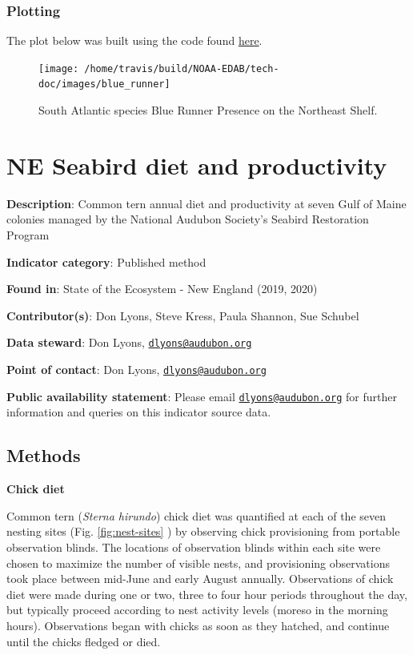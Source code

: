 \documentclass[
]{book}
\begin{document}
\hypertarget{plotting-24}{%
\subsection{Plotting}\label{plotting-24}}

The plot below was built using the code found
\href{https://github.com/NOAA-EDAB/ecodata/blob/master/chunk-scripts/macrofauna.Rmd-blue-runner.R}{here}.

\begin{figure}
\texttt{[image: /home/travis/build/NOAA-EDAB/tech-doc/images/blue\_runner]} \caption{South Atlantic species Blue Runner Presence on the Northeast Shelf.}\label{fig:unnamed-chunk-33}
\end{figure}

\hypertarget{ne-seabird-diet-and-productivity}{%
\chapter{NE Seabird diet and productivity}\label{ne-seabird-diet-and-productivity}}

\textbf{Description}: Common tern annual diet and productivity at seven Gulf of Maine colonies managed by the National Audubon Society's Seabird Restoration Program

\textbf{Indicator category}: Published method

\textbf{Found in}: State of the Ecosystem - New England (2019, 2020)

\textbf{Contributor(s)}: Don Lyons, Steve Kress, Paula Shannon, Sue Schubel

\textbf{Data steward}: Don Lyons, \href{mailto:dlyons@audubon.org}{\nolinkurl{dlyons@audubon.org}}

\textbf{Point of contact}: Don Lyons, \href{mailto:dlyons@audubon.org}{\nolinkurl{dlyons@audubon.org}}

\textbf{Public availability statement}: Please email \href{mailto:dlyons@audubon.org}{\nolinkurl{dlyons@audubon.org}} for further information and queries on this indicator source data.

\hypertarget{methods-32}{%
\section{Methods}\label{methods-32}}

\textbf{Chick diet}

Common tern (\emph{Sterna hirundo}) chick diet was quantified at each of the seven nesting sites (Fig. \ref{fig:nest-sites} ) by observing chick provisioning from portable observation blinds. The locations of observation blinds within each site were chosen to maximize the number of visible nests, and provisioning observations took place between mid-June and early August annually. Observations of chick diet were made during one or two, three to four hour periods throughout the day, but typically proceed according to nest activity levels (moreso in the morning hours). Observations began with chicks as soon as they hatched, and continue until the chicks fledged or died.
\end{document}
